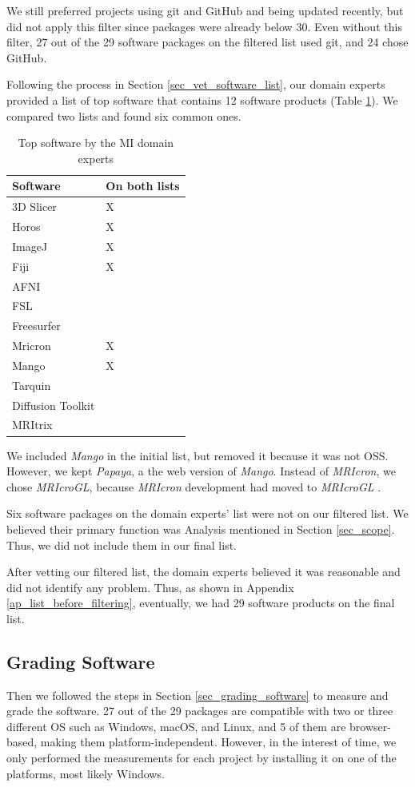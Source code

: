 We still preferred projects using git and GitHub and being updated recently, but did not apply this filter since packages were already below 30. Even without this filter, 27 out of the 29 software packages on the filtered list used git, and 24 chose GitHub.

Following the process in Section \ref{sec_vet_software_list}, our domain experts provided a list of top software that contains 12 software products (Table \ref{tab_top_software_experts}). We compared two lists and found six common ones.

\begin{table}[H]
\centering
\begin{tabular}{ll}
\hline
Software & On both lists \\ \hline
3D Slicer & X \\
Horos & X \\
ImageJ & X \\
Fiji & X \\
AFNI &  \\
FSL &  \\
Freesurfer &  \\
Mricron & X \\
Mango & X \\
Tarquin &  \\
Diffusion Toolkit &  \\
MRItrix &  \\ \hline
\end{tabular}
\caption{\label{tab_top_software_experts}Top software by the MI domain experts}
\end{table}

We included \textit{Mango} in the initial list, but removed it because it was not OSS. However, we kept \textit{Papaya}, a the web version of \textit{Mango}. Instead of \textit{MRIcron}, we chose \textit{MRIcroGL}, because \textit{MRIcron} development had moved to
\textit{MRIcroGL} \cite{Rorden2021b}.

Six software packages on the domain experts' list were not on our filtered list. We believed their primary function was Analysis mentioned in Section \ref{sec_scope}. Thus, we did not include them in our final list.

After vetting our filtered list, the domain experts believed it was reasonable and did not identify any problem. Thus, as shown in Appendix \ref{ap_list_before_filtering}, eventually, we had 29 software products on the final list. 

\subsection{Grading Software}
Then we followed the steps in Section \ref{sec_grading_software} to measure and grade the software. 27 out of the 29 packages are compatible with two or three different OS such as Windows, macOS, and Linux, and 5 of them are browser-based, making them platform-independent. However, in the interest of time, we only performed the measurements for each project by installing it on one of the platforms, most likely Windows.

